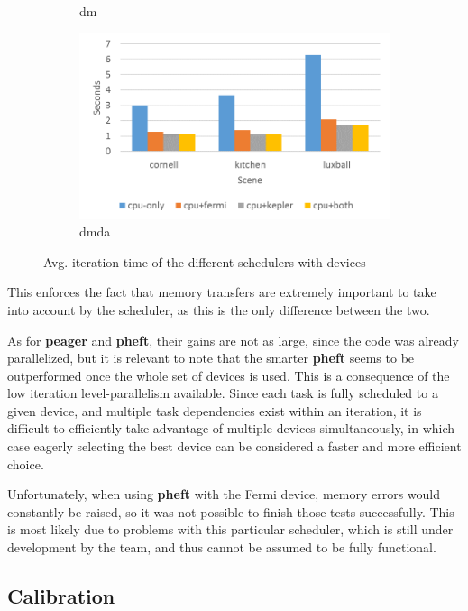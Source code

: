 \documentclass[main.tex]{subfiles}
\begin{document}
\begin{figure}[!htp]
\begin{subfigure}{.5\textwidth}
    \caption{dm \label{fig:prof:starpu_sched_dm}}
  \end{subfigure}%
  \begin{subfigure}{.5\textwidth}
    \centering
    \includegraphics[width=\linewidth]{profiling/starpu_sched_dmda}
    \caption{dmda \label{fig:prof:starpu_sched_dmda}}
  \end{subfigure}
  \caption{Avg. iteration time of the different schedulers with \gpu devices \label{fig:prof:starpu_scheds}}
\end{figure}

This enforces the fact that memory transfers are extremely important to take into account by the scheduler, as this is the only difference between the two.

As for \textbf{peager} and \textbf{pheft}, their gains are not as large, since the \cpu code was already parallelized, but it is relevant to note that the smarter \textbf{pheft} seems to be outperformed once the whole set of devices is used. This is a consequence of the low iteration level-parallelism available. Since each task is fully scheduled to a given device, and multiple task dependencies exist within an iteration, it is difficult to efficiently take advantage of multiple devices simultaneously, in which case eagerly selecting the best device can be considered a faster and more efficient choice.

Unfortunately, when using \textbf{pheft} with the Fermi device, memory errors would constantly be raised, so it was not possible to finish those tests successfully. This is most likely due to problems with this particular scheduler, which is still under development by the \starpu team, and thus cannot be assumed to be fully functional.


\subsection{Calibration} \label{sec:prof:calibration}
\end{document}
